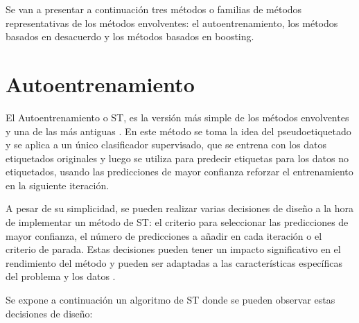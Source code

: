 Se van a presentar a continuación tres métodos o familias de métodos representativas de los métodos envolventes: el autoentrenamiento, los métodos basados en desacuerdo y los métodos basados en boosting.

\section{Autoentrenamiento}

El Autoentrenamiento o \gls{ST}, es la versión más simple de los métodos envolventes y una de las más antiguas \cite{yarowsky1995unsupervised}. En este método se toma la idea del pseudoetiquetado y se aplica a un único clasificador supervisado, que se entrena con los datos etiquetados originales y luego se utiliza para predecir etiquetas para los datos no etiquetados, usando las predicciones de mayor confianza reforzar el entrenamiento en la siguiente iteración.

A pesar de su simplicidad, se pueden realizar varias decisiones de diseño a la hora de implementar un método de \gls{ST}: el criterio para seleccionar las predicciones de mayor confianza, el número de predicciones a añadir en cada iteración o el criterio de parada. Estas decisiones pueden tener un impacto significativo en el rendimiento del método y pueden ser adaptadas a las características específicas del problema y los datos \cite{van2020survey}.

Se expone a continuación un algoritmo de \gls{ST} donde se pueden observar estas decisiones de diseño:

